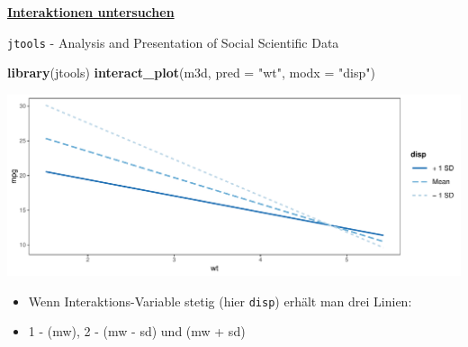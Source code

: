 \documentclass[ignorenonframetext,]{beamer}
\newenvironment{Shaded}{\begin{snugshade}}{\end{snugshade}}
\newcommand{\KeywordTok}[1]{\textcolor[rgb]{0.13,0.29,0.53}{\textbf{#1}}}
\newcommand{\DataTypeTok}[1]{\textcolor[rgb]{0.13,0.29,0.53}{#1}}
\newcommand{\StringTok}[1]{\textcolor[rgb]{0.31,0.60,0.02}{#1}}
\newcommand{\NormalTok}[1]{#1}
\providecommand{\tightlist}{%
  \setlength{\itemsep}{0pt}\setlength{\parskip}{0pt}}
\begin{document}
\begin{frame}[fragile]{\href{https://cran.r-project.org/web/packages/jtools/vignettes/interactions.html}{\textbf{Interaktionen
untersuchen}}}

\begin{block}{\texttt{jtools} - Analysis and Presentation of Social
Scientific Data}

\begin{Shaded}
\begin{Highlighting}[]
\KeywordTok{library}\NormalTok{(jtools)}
\KeywordTok{interact_plot}\NormalTok{(m3d, }\DataTypeTok{pred =} \StringTok{"wt"}\NormalTok{, }\DataTypeTok{modx =} \StringTok{"disp"}\NormalTok{)}
\end{Highlighting}
\end{Shaded}

\includegraphics{B3_linreg_files/figure-beamer/unnamed-chunk-15-1.pdf}

\begin{itemize}
\tightlist
\item
  Wenn Interaktions-Variable stetig (hier \texttt{disp}) erhält man drei
  Linien:
\item
  1 - (mw), 2 - (mw - sd) und (mw + sd)
\end{itemize}

\end{block}

\end{frame}
\end{document}
